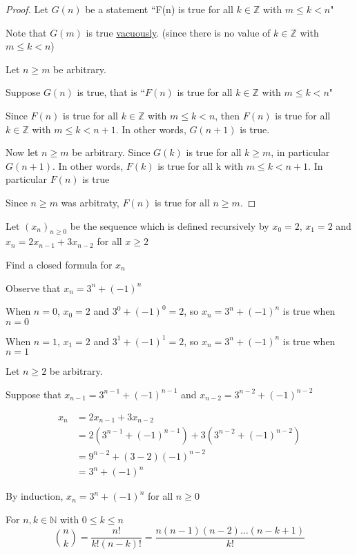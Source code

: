 \begin{proof}
Let $G(n)$ be a statement ``F(n) is true for all $k\in \mathbb{Z}$ with $m\leq k < n$"

Note that $G(m)$ is true \underline{vacuously}. (since there is no value of $k\in \mathbb{Z}$ with $m\leq k < n$)

Let $n\geq m$ be arbitrary.

Suppose $G(n)$ is true, that is ``$F(n)$ is true for all $k\in\mathbb{Z}$ with $m\leq k < n$"

Since $F(n)$ is true for all $k\in\mathbb{Z}$ with $m\leq k < n$, then $F(n)$ is true for all $k\in\mathbb{Z}$ with $m\leq k < n+1$. In other words, $G(n+1)$ is true.


Now let $n\geq m$ be arbitrary. Since $G(k)$ is true for all $k\geq m$, in particular $G(n+1)$. In other words, $F(k)$ is true for all k with $m\leq k < n+1$. In particular $F(n)$ is true

Since $n\geq m$ was arbitraty, $F(n)$ is true for all $n\geq m$.
\end{proof}


\begin{exmp}
Let $(x_n)_{n\geq 0}$ be the sequence which is defined recursively by $x_0 = 2$, $x_1 = 2$ and $x_n = 2 x_{n-1} + 3 x_{n-2}$ for all $x\geq 2$

Find a closed formula for $x_n$
\end{exmp}

\begin{solution}
Observe that $x_n = 3^n + (-1)^n$

When $n = 0$, $x_0 = 2 $ and $3^0 + (-1)^0 = 2$, so $x_n = 3^n + (-1)^n$ is true when $n = 0$

When $n = 1$, $x_1 = 2 $ and $3^1 + (-1)^1 = 2$, so $x_n = 3^n + (-1)^n$ is true when $n = 1$

Let $n \geq 2$ be arbitrary.

Suppose that $x_{n-1} = 3^{n-1}+(-1)^{n-1}$ and $x_{n-2} = 3^{n-2}+(-1)^{n-2}$

\begin{align*}
    x_n & = 2x_{n-1}+3x_{n-2} \\
    & = 2(3^{n-1}+(-1)^{n-1}) + 3(3^{n-2}+(-1)^{n-2})\\
    & = 9^{n-2}+(3-2)(-1)^{n-2} \\
    & = 3^{n}+(-1)^{n}
\end{align*}

By induction, $x_n = 3^n + (-1)^n$ for all $n\geq 0$


\end{solution}


\begin{defn}
For $n,k\in\mathbb{N}$ with $0\leq k\leq n$
\[
\binom{n}{k} = \frac{n!}{k!(n-k)!} = \frac{n(n-1)(n-2)\dots (n-k+1)}{k!}
\]

\end{defn}




